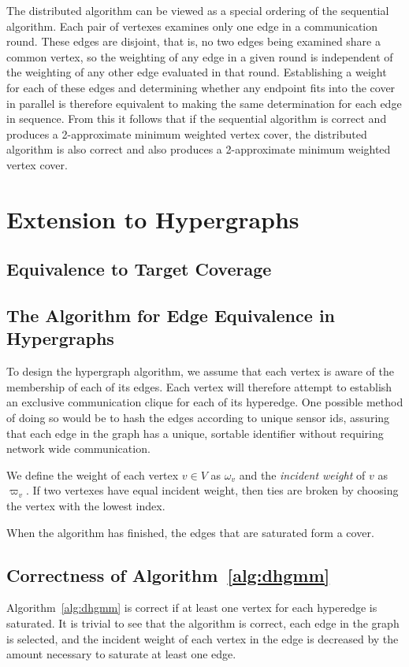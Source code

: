 \documentclass[conference, 11pt]{IEEEtran}
\theoremstyle{definition}
\begin{document}
The distributed algorithm can be viewed as a special ordering of the sequential algorithm. Each pair of vertexes examines only one edge in a communication round. These edges are disjoint, that is, no two edges being examined share a common vertex, so the weighting of any edge in a given round is independent of the weighting of any other edge evaluated in that round. Establishing a weight for each of these edges and determining whether any endpoint fits into the cover in parallel is therefore equivalent to making the same determination for each edge in sequence. From this it follows that if the sequential algorithm is correct and produces a 2-approximate minimum weighted vertex cover, the distributed algorithm is also correct and also produces a 2-approximate minimum weighted vertex cover.   

\section{Extension to Hypergraphs}
\subsection{Equivalence to Target Coverage}

\subsection{The Algorithm for Edge Equivalence in Hypergraphs}
To design the hypergraph algorithm, we assume that each vertex is aware of the membership of each of its edges. Each vertex will therefore attempt to establish an exclusive communication clique for each of its hyperedge. One possible method of doing so would be to hash the edges according to unique sensor ids, assuring that each edge in the graph has a unique, sortable identifier without requiring network wide communication.

We define the weight of each vertex $v \in V$ as $\omega_v$ and the {\em incident weight} of $v$ as $\varpi_v$. If two vertexes have equal incident weight, then ties are broken by choosing the vertex with the lowest index.



When the algorithm has finished, the edges that are saturated form a cover.
\subsection{Correctness of Algorithm~\ref{alg:dhgmm}}
Algorithm~\ref{alg:dhgmm} is correct if at least one vertex for each hyperedge is saturated. It is trivial to see that the algorithm is correct, each edge in the graph is selected, and the incident weight of each vertex in the edge is decreased by the amount necessary to saturate at least one edge.
\end{document}
